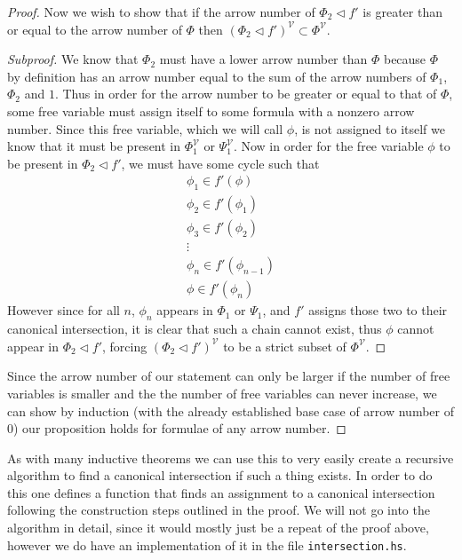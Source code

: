 \documentclass{article}
\newenvironment{subproof}{%
  \begin{proof}[Subproof]%
}{%
  \end{proof}%
}
\begin{document}
\begin{proof}
Now we wish to show that if the arrow number of $\Phi_2\lhd f'$ is greater than or equal to the arrow number of $\Phi$ then $(\Phi_2\lhd f')^\mathcal{V}\subset\Phi^\mathcal{V}$.
\begin{subproof}
We know that $\Phi_2$ must have a lower arrow number than $\Phi$ because $\Phi$ by definition has an arrow number equal to the sum of the arrow numbers of $\Phi_1$, $\Phi_2$ and $1$.
Thus in order for the arrow number to be greater or equal to that of $\Phi$, some free variable must assign itself to some formula with a nonzero arrow number.
Since this free variable, which we will call $\phi$, is not assigned to itself we know that it must be present in $\Phi_1^\mathcal{V}$ or $\Psi_1^\mathcal{V}$.
Now in order for the free variable $\phi$ to be present in $\Phi_2\lhd f'$, we must have some cycle such that
\begin{gather*}
\phi_1 \in f'(\phi)\\
\phi_2 \in f'(\phi_1)\\
\phi_3 \in f'(\phi_2)\\
 \vdots \\
\phi_n \in f'(\phi_{n-1})\\
\phi \in f'(\phi_n)
\end{gather*} 
However since for all $n$, $\phi_n$ appears in $\Phi_1$ or $\Psi_1$, and $f'$ assigns those two to their canonical intersection, it is clear that such a chain cannot exist,
thus $\phi$ cannot appear in $\Phi_2\lhd f'$, forcing $(\Phi_2\lhd f')^\mathcal{V}$ to be a strict subset of $\Phi^\mathcal{V}$.
\end{subproof}

Since the arrow number of our statement can only be larger if the number of free variables is smaller and the the number of free variables can never increase,
we can show by induction (with the already established base case of arrow number of $0$) our proposition holds for formulae of any arrow number.

\end{proof}

As with many inductive theorems we can use this to very easily create a recursive algorithm to find a canonical intersection if such a thing exists.
In order to do this one defines a function that finds an assignment to a canonical intersection following the construction steps outlined in the proof.
We will not go into the algorithm in detail, since it would mostly just be a repeat of the proof above, however we do have an implementation of it in the file
\texttt{intersection.hs}.
\end{document}
